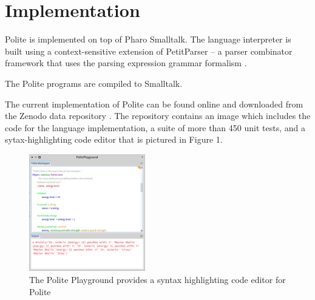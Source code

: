 

\section{Implementation}
Polite is implemented on top of Pharo Smalltalk. The language interpreter is built using a context-sensitive extension of PetitParser -- a parser combinator framework that uses the parsing expression grammar formalism \cite{Kurs14a-ParsingContext}. 

The Polite programs are compiled to Smalltalk.

The current implementation of Polite can be found online and downloaded from  the Zenodo data repository \cite{kurs16-polite}. The repository contains an image which includes the code for the language implementation, a suite of more than 450 unit tests, and a sytax-highlighting code editor that is pictured in Figure 1. 

\begin{figure}[h]
	\centering
	\includegraphics[width=0.45\textwidth]{images/playground.png}
	\caption{The Polite Playground provides a syntax highlighting code editor for Polite}
	\label{fig:figure1}
\end{figure}
